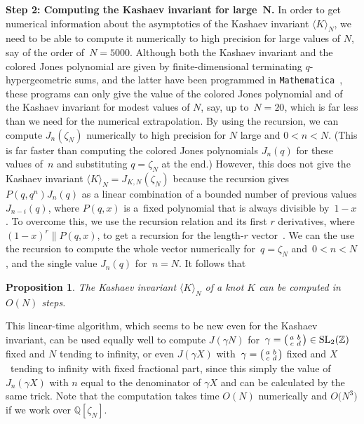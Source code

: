 \documentclass[pdftex]{sigma}
\numberwithin{equation}{section}
\newtheorem{Proposition}[Theorem]{Proposition}
\def\BQ{\mathbb Q}
\def\la{\langle}
\def\ra{\rangle}
\def\SL{\mathrm{SL}}
\def\z{\zeta}
\def\Z{\mathbb Z}
\def\z{\zeta}
\def\sma#1#2#3#4{\bigl(\smallmatrix#1&#2\\#3&#4\endsmallmatrix\bigr)} %
\def\g{\gamma}
\begin{document}
{\bf Step 2: Computing the Kashaev invariant for large~$\boldsymbol{N}$.}
In order to get numerical information about the asymptotics
of the Kashaev invariant $\la K \ra_N$, we need to be able to compute it
numerically to high precision for large values of $N$, say of the order
of~$N=5000$. Although both the Kashaev invariant and the colored Jones
polynomial are given by finite-dimensional terminating $q$-hypergeometric sums,
and the latter have been programmed in \texttt{Mathematica}~\cite{B-N},
these programs can only give the value of the colored Jones polynomial
and of the Kashaev invariant for modest values of $N$, say, up to~$N=20$,
which is far less than we need for the numerical extrapolation. By using the
recursion, we can compute $J_n(\z_N)$ numerically to high precision for
$N$ large and $0<n<N$. (This is far faster than computing the colored Jones
polynomials $J_n(q)$ for these values of~$n$ and substituting $q=\z_N$ at
the end.) However, this does not give the Kashaev invariant
$\la K \ra_N=J_{K,N}(\z_N)$ because the recursion gives $P(q,q^n)J_n(q)$
as a linear combination of a bounded number of previous values $J_{n-i}(q)$,
where $P(q,x)$ is a~fixed polynomial that is always divisible by~$1-x$.
To overcome this, we use the recursion relation and its first $r$ derivatives,
where $(1-x)^r\|P(q,x)$, to get a recursion for the length-$r$ vector~. We can the use the recursion to compute
the whole vector numerically for~$q=\z_N$ and~$0<n<N$, and the single value
$J_n(q)$ for~$n=N$. It follows that

\begin{Proposition}
 \label{prop.ckashaev}
The Kashaev invariant $\la K \ra_N$ of a knot $K$ can be computed
in $O(N)$ steps.
\end{Proposition}

This linear-time algorithm, which seems to be new even for the Kashaev invariant,
can be used equally well to compute $J(\g N)$ for~$\g=\sma abcd\in\SL_2(\Z)$ fixed and
$N$ tending to infinity, or even $J(\g X)$ with~$\g=\sma abcd$ fixed and $X$~tending to
infinity with fixed fractional part, since this simply the value of $J_n(\g X)$ with $n$
equal to the denominator of $\g X$ and can be calculated by the same trick. Note
that the computation takes time $O(N)$ numerically and $O\big(N^3\big)$ if we work over
$\BQ[\z_N]$.
\end{document}
